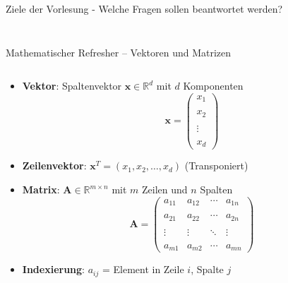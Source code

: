 \documentclass[aspectratio=1610, xcolor=dvipsnames, 9pt]{beamer}
\begin{document}
\begin{frame}{Ziele der Vorlesung - Welche Fragen sollen beantwortet werden?}
\begin{columns}
\begin{column}{0.3\textwidth}
\begin{figure}
             [\url{https://xkcd.com/2451/}]
 \end{figure}
    \end{column}
  \end{columns}
\end{frame}

\begin{frame}{Mathematischer Refresher -- Vektoren und Matrizen}
  \begin{columns}
    \begin{column}{1\textwidth}
      \begin{itemize}
        \item \textbf{Vektor}: Spaltenvektor $\mathbf{x} \in \mathbb{R}^d$ mit $d$ Komponenten
        \begin{equation}
          \mathbf{x} = \begin{pmatrix} x_1 \\\\ x_2 \\\\ \vdots \\\\ x_d \end{pmatrix}
        \end{equation}
        \item \textbf{Zeilenvektor}: $\mathbf{x}^T = (x_1, x_2, \ldots, x_d)$ (Transponiert)
        \item \textbf{Matrix}: $\mathbf{A} \in \mathbb{R}^{m \times n}$ mit $m$ Zeilen und $n$ Spalten
        \begin{equation}
          \mathbf{A} = \begin{pmatrix}
            a_{11} & a_{12} & \cdots & a_{1n} \\\\
            a_{21} & a_{22} & \cdots & a_{2n} \\\\
            \vdots & \vdots & \ddots & \vdots \\\\
            a_{m1} & a_{m2} & \cdots & a_{mn}
          \end{pmatrix}
        \end{equation}
        \item \textbf{Indexierung}: $a_{ij}$ = Element in Zeile $i$, Spalte $j$
      \end{itemize}
    \end{column}
  \end{columns}
\end{frame}
\end{document}
